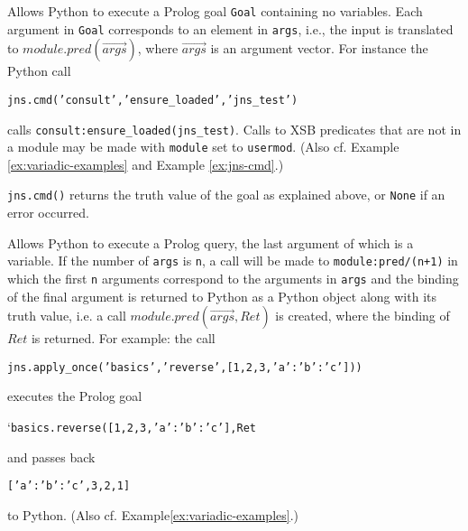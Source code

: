 \begin{description}

%
  Allows Python to execute a Prolog goal {\tt Goal} containing no
  variables.  Each argument in {\tt Goal} corresponds to an element in
  {\tt args}, i.e., the input is translated to
  $module.pred(\overrightarrow{args})$, where $\overrightarrow{args}$ is an
  argument vector.  For instance the Python call

  {\tt jns.cmd('consult','ensure\_loaded','jns\_test')}

  calls {\tt consult:ensure\_loaded(jns\_test)}.  Calls to XSB
  predicates that are not in a module may be made with {\tt module}
  set to {\tt usermod}. (Also cf. Example \ref{ex:variadic-examples}
  and Example \ref{ex:jns-cmd}.)

  {\tt jns.cmd()} returns the truth value of the goal as explained
  above, or {\tt None} if an error occurred.
  
%
  Allows Python to execute a Prolog query, the last argument of which
  is a variable.  If the number of {\tt args} is {\tt n}, a call will
  be made to {\tt module:pred/(n+1)} in which the first {\tt n}
  arguments correspond to the arguments in {\tt args} and the binding
  of the final argument is returned to Python as a Python object along
  with its truth value, i.e. a call
  $module.pred(\overrightarrow{args},Ret)$ is created, where the
  binding of $Ret$ is returned.
  For example: the call

  {\tt jns.apply\_once('basics','reverse',[1,2,3,{'a':{'b':'c'}}]))}

  \noindent
  executes the Prolog goal

  `{\tt basics.reverse([1,2,3,{'a':{'b':'c'}}],Ret}

  \noindent
  and passes back

  {\tt [{'a':{'b':'c'}},3,2,1]}

  \noindent
  to Python.  (Also cf. Example\ref{ex:variadic-examples}.)




\end{description}
